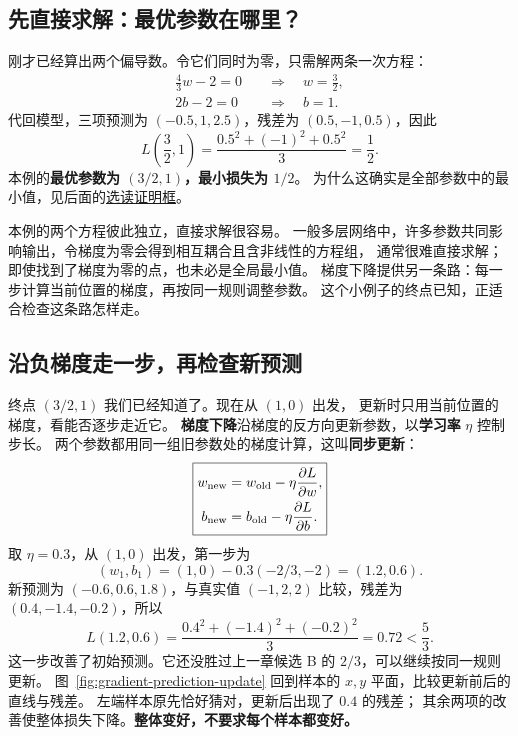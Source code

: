 \subsection{先直接求解：最优参数在哪里？}
\label{intro:gradient-direct-solution}

刚才已经算出两个偏导数。令它们同时为零，只需解两条一次方程：
\[
\begin{aligned}
\frac43w-2=0&\quad\Longrightarrow\quad w=\frac32,\\
2b-2=0&\quad\Longrightarrow\quad b=1.
\end{aligned}
\]
代回模型，三项预测为 $(-0.5,1,2.5)$，残差为 $(0.5,-1,0.5)$，因此
\[
L\left(\frac32,1\right)=\frac{0.5^2+(-1)^2+0.5^2}{3}=\boxed{\frac12}.
\]
本例的\textbf{最优参数为 $(3/2,1)$，最小损失为 $1/2$}。
为什么这确实是全部参数中的最小值，见后面的\hyperref[proof:three-point-global-minimum]{选读证明框}。

\begin{boundarybox}[title={能直接解，为什么还要学迭代？}]
本例的两个方程彼此独立，直接求解很容易。
一般多层网络中，许多参数共同影响输出，令梯度为零会得到相互耦合且含非线性的方程组，
通常很难直接求解；即使找到了梯度为零的点，也未必是全局最小值。
梯度下降提供另一条路：每一步计算当前位置的梯度，再按同一规则调整参数。
这个小例子的终点已知，正适合检查这条路怎样走。
\end{boundarybox}

\subsection{沿负梯度走一步，再检查新预测}
\label{concept:gradient-descent}

终点 $(3/2,1)$ 我们已经知道了。现在从 $(1,0)$ 出发，
更新时只用当前位置的梯度，看能否逐步走近它。
\textbf{梯度下降}沿梯度的反方向更新参数，以\textbf{学习率} $\eta$ 控制步长。
两个参数都用同一组旧参数处的梯度计算，这叫\textbf{同步更新}：
\begin{equation}
\boxed{\begin{aligned}
w_{\rm new}&=w_{\rm old}-\eta\frac{\partial L}{\partial w},\\
b_{\rm new}&=b_{\rm old}-\eta\frac{\partial L}{\partial b}.
\end{aligned}}
\label{eq:gradient-simple}
\end{equation}
取 $\eta=0.3$，从 $(1,0)$ 出发，第一步为
\[
(w_1,b_1)=(1,0)-0.3(-2/3,-2)=\boxed{(1.2,0.6)}.
\]
新预测为 $(-0.6,0.6,1.8)$，与真实值 $(-1,2,2)$ 比较，残差为 $(0.4,-1.4,-0.2)$，所以
\[
L(1.2,0.6)=\frac{0.4^2+(-1.4)^2+(-0.2)^2}{3}=\boxed{0.72}<\frac53.
\]
这一步改善了初始预测。它还没胜过上一章候选 B 的 $2/3$，可以继续按同一规则更新。
图~\ref{fig:gradient-prediction-update} 回到样本的 $x,y$ 平面，比较更新前后的直线与残差。
左端样本原先恰好猜对，更新后出现了 $0.4$ 的残差；
其余两项的改善使整体损失下降。\textbf{整体变好，不要求每个样本都变好。}



